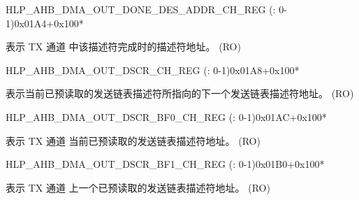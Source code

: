 \begin{register}{H}{LP\_AHB\_DMA\_OUT\_DONE\_DES\_ADDR\_CH\_REG (: 0-1)}{0x01A4+0x100*}\label{regdesc:LPAHBDMAOUTDONEDESADDRCHNREG}
%
\regnewline%
\begin{regdesc}\begin{reglist}
\label{fielddesc:LPAHBDMAOUTDONEDESADDRCHN}\item [LP\_AHB\_DMA\_OUT\_DONE\_DES\_ADDR\_CH\regindex{n}] 表示 TX 通道  中该描述符完成时的描述符地址。 (RO)
\end{reglist}\end{regdesc}
\end{register}


\begin{register}{H}{LP\_AHB\_DMA\_OUT\_DSCR\_CH\_REG (: 0-1)}{0x01A8+0x100*}\label{regdesc:LPAHBDMAOUTDSCRCHNREG}
%
\regnewline%
\begin{regdesc}\begin{reglist}
\label{fielddesc:LPAHBDMAOUTLINKDSCRCHN}\item [LP\_AHB\_DMA\_OUTLINK\_DSCR\_CH\regindex{n}] 表示当前已预读取的发送链表描述符所指向的下一个发送链表描述符地址。 (RO)
\end{reglist}\end{regdesc}
\end{register}


\begin{register}{H}{LP\_AHB\_DMA\_OUT\_DSCR\_BF0\_CH\_REG (: 0-1)}{0x01AC+0x100*}\label{regdesc:LPAHBDMAOUTDSCRBF0CHNREG}
%
\regnewline%
\begin{regdesc}\begin{reglist}
\label{fielddesc:LPAHBDMAOUTLINKDSCRBF0CHN}\item [LP\_AHB\_DMA\_OUTLINK\_DSCR\_BF0\_CH\regindex{n}] 表示 TX 通道  当前已预读取的发送链表描述符地址。 (RO)
\end{reglist}\end{regdesc}
\end{register}


\begin{register}{H}{LP\_AHB\_DMA\_OUT\_DSCR\_BF1\_CH\_REG (: 0-1)}{0x01B0+0x100*}\label{regdesc:LPAHBDMAOUTDSCRBF1CHNREG}
%
\regnewline%
\begin{regdesc}\begin{reglist}
\label{fielddesc:LPAHBDMAOUTLINKDSCRBF1CHN}\item [LP\_AHB\_DMA\_OUTLINK\_DSCR\_BF1\_CH\regindex{n}] 表示 TX 通道  上一个已预读取的发送链表描述符地址。 (RO)
\end{reglist}\end{regdesc}
\end{register}


